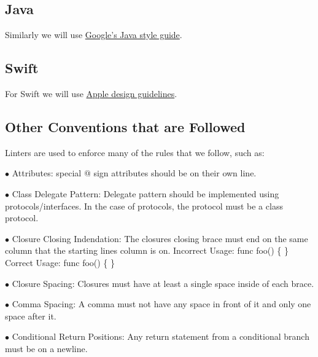 \documentclass[12pt]{article}
\newcommand\tab[1][0.5cm]{\hspace*{#1}}
\begin{document}
  \subsection{Java}
  Similarly we will use \href{https://google.github.io/styleguide/javaguide.html}{Google's Java style guide}.
  
  \subsection{Swift}
  For Swift we will use \href{https://swift.org/documentation/api-design-guidelines/}{Apple design guidelines}.
  
	\subsection{Other Conventions that are Followed}
Linters are used to enforce many of the rules that we follow, such as:
\item[$\bullet$]Attributes: \newline special @ sign attributes should be on their own line.
\item[$\bullet$]Class Delegate Pattern: \newline Delegate pattern should be implemented using protocols/interfaces. In the case of protocols, the protocol must be a class protocol.
\item[$\bullet$]Closure Closing Indendation: \newline The closures closing brace must end on the same column that the starting lines column is on.\newpage
Incorrect Usage:\newline
  func foo() \{ \newline
   	\tab \} \newline
  Correct Usage: \newline
  func foo() \{ \newline
  \} \newline
\item[$\bullet$]Closure Spacing: \newline Closures must have at least a single space inside of each brace.
\item[$\bullet$]Comma Spacing: \newline A comma must not have any space in front of it and only one space after it.
\item[$\bullet$]Conditional Return Positions: \newline Any return statement from a conditional branch must be on a newline.\newline 
\end{document}
